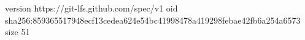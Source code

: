 version https://git-lfs.github.com/spec/v1
oid sha256:859365517948ecf13cedea624e54bc41998478a419298febae42fb6a254a6573
size 51
